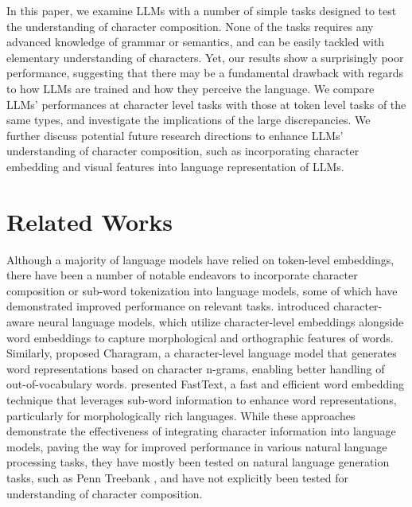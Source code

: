 \documentclass{article}
\theoremstyle{plain}
\theoremstyle{definition}
\theoremstyle{remark}
\begin{document}
In this paper, we examine LLMs with a number of simple tasks designed to test the understanding of character composition. None of the tasks requires any advanced knowledge of grammar or semantics, and can be easily tackled with elementary understanding of characters. Yet, our results show a surprisingly poor performance, suggesting that there may be a fundamental drawback with regards to how LLMs are trained and how they perceive the language. We compare LLMs' performances at character level tasks with those at token level tasks of the same types, and investigate the implications of the large discrepancies. We further discuss potential future research directions to enhance LLMs' understanding of character composition, such as incorporating character embedding and visual features into language representation of LLMs.

\section{Related Works}
Although a majority of language models have relied on token-level embeddings, there have been a number of notable endeavors to incorporate character composition or sub-word tokenization into language models, some of which have demonstrated improved performance on relevant tasks. \cite{Kim2015CharacterAwareNL} introduced character-aware neural language models, which utilize character-level embeddings alongside word embeddings to capture morphological and orthographic features of words. Similarly, \cite{wieting-etal-2016-charagram} proposed Charagram, a character-level language model that generates word representations based on character n-grams, enabling better handling of out-of-vocabulary words. \cite{Bojanowski2016EnrichingWV} presented FastText, a fast and efficient word embedding technique that leverages sub-word information to enhance word representations, particularly for morphologically rich languages. While these approaches demonstrate the effectiveness of integrating character information into language models, paving the way for improved performance in various natural language processing tasks, they have mostly been tested on natural language generation tasks, such as Penn Treebank \cite{Marcus1993BuildingAL}, and have not explicitly been tested for understanding of character composition.
\end{document}

